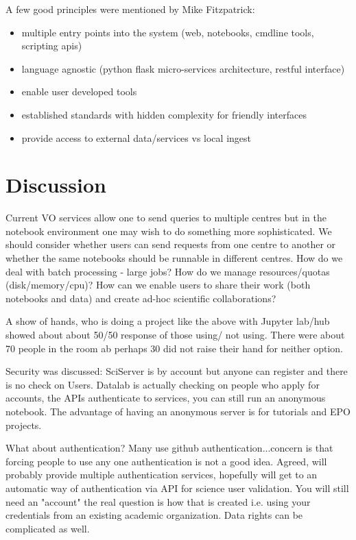 \documentclass[11pt,twoside]{article}
\begin{document}
A few good principles were mentioned by Mike Fitzpatrick:
\begin{itemize}
\item multiple entry points into the system (web, notebooks, cmdline tools, scripting apis)
\item language agnostic (python flask micro-services architecture, restful interface)
\item  enable user developed tools
\item  established standards with hidden complexity for friendly interfaces
\item  provide access to external data/services vs local ingest
\end{itemize}


\section{Discussion}
Current VO services allow one to send queries to multiple centres but in the notebook environment one may wish to do something more sophisticated. We should consider whether users can send requests from one centre to another or whether the same notebooks should be runnable in different centres.
How do we deal with batch processing - large jobs? How do we manage resources/quotas (disk/memory/cpu)?  How can we enable users to share their work (both notebooks and data) and create ad-hoc scientific collaborations?

A show of hands, who is doing a project like the above with Jupyter lab/hub showed about about 50/50 response of those using/ not using. There were about 70 people in the room ab perhaps 30 did not raise their hand for neither option.

Security was discussed:
SciServer is by account but anyone can register and there is no check on Users.
Datalab is actually checking on people who apply for accounts, the APIs authenticate to services, you can still run an anonymous notebook. The advantage of having an anonymous server is for tutorials and EPO projects.

What about  authentication? Many use github authentication...concern is that forcing people to use any one authentication is not a good idea.
Agreed, will probably provide multiple authentication services, hopefully will get to an automatic way of authentication via API for science user validation. You will still need an "account" the real question is how that is created i.e. using your credentials from an existing academic organization.  Data rights can be complicated as well.
\end{document}
